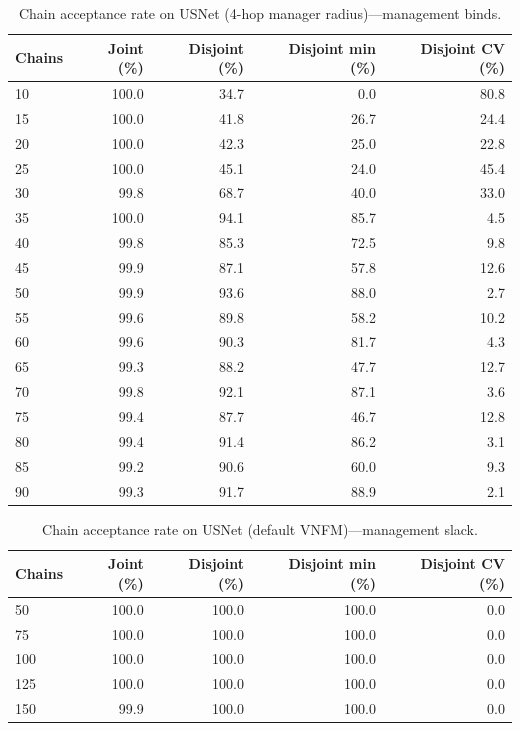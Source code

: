 \begin{table}[H]
\caption{Chain acceptance rate on USNet (4-hop manager radius)---management
binds.}
\label{tbl:acceptance-usnet-radius}
\begin{tabularx}{\textwidth}{Xrrrr}
\toprule
\textbf{Chains} & \textbf{Joint (\%)} & \textbf{Disjoint (\%)} & \textbf{Disjoint min (\%)} & \textbf{Disjoint CV (\%)} \\
\midrule
10 & 100.0 & 34.7 & 0.0 & 80.8 \\
15 & 100.0 & 41.8 & 26.7 & 24.4 \\
20 & 100.0 & 42.3 & 25.0 & 22.8 \\
25 & 100.0 & 45.1 & 24.0 & 45.4 \\
30 & 99.8 & 68.7 & 40.0 & 33.0 \\
35 & 100.0 & 94.1 & 85.7 & 4.5 \\
40 & 99.8 & 85.3 & 72.5 & 9.8 \\
45 & 99.9 & 87.1 & 57.8 & 12.6 \\
50 & 99.9 & 93.6 & 88.0 & 2.7 \\
55 & 99.6 & 89.8 & 58.2 & 10.2 \\
60 & 99.6 & 90.3 & 81.7 & 4.3 \\
65 & 99.3 & 88.2 & 47.7 & 12.7 \\
70 & 99.8 & 92.1 & 87.1 & 3.6 \\
75 & 99.4 & 87.7 & 46.7 & 12.8 \\
80 & 99.4 & 91.4 & 86.2 & 3.1 \\
85 & 99.2 & 90.6 & 60.0 & 9.3 \\
90 & 99.3 & 91.7 & 88.9 & 2.1 \\
\bottomrule
\end{tabularx}
\end{table}

\begin{table}[H]
\caption{Chain acceptance rate on USNet (default VNFM)---management slack.}
\label{tbl:acceptance-usnet-slack}
\begin{tabularx}{\textwidth}{Xrrrr}
\toprule
\textbf{Chains} & \textbf{Joint (\%)} & \textbf{Disjoint (\%)} & \textbf{Disjoint min (\%)} & \textbf{Disjoint CV (\%)} \\
\midrule
50 & 100.0 & 100.0 & 100.0 & 0.0 \\
75 & 100.0 & 100.0 & 100.0 & 0.0 \\
100 & 100.0 & 100.0 & 100.0 & 0.0 \\
125 & 100.0 & 100.0 & 100.0 & 0.0 \\
150 & 99.9 & 100.0 & 100.0 & 0.0 \\
\bottomrule
\end{tabularx}
\end{table}

